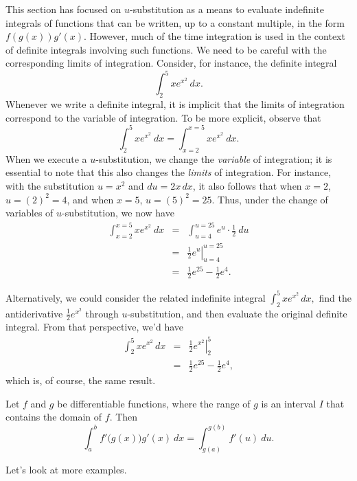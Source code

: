 This section has focused on $u$-substitution as a means to evaluate indefinite integrals of functions that can be written, up to a constant multiple, in the form $f(g(x))g'(x)$.  However, much of the time integration is used in the context of definite integrals involving such functions. We need to be careful with the corresponding limits of integration.  Consider, for instance, the definite integral
\[ \int_2^5 xe^{x^2} \ dx. \]
Whenever we write a definite integral, it is implicit that the limits of integration correspond to the variable of integration.  To be more explicit, observe that
\[ \int_2^5 xe^{x^2} \ dx = \int_{x=2}^{x=5} xe^{x^2} \ dx. \]
When we execute a $u$-substitution, we change the \emph{variable} of integration; it is essential to note that this also changes the \emph{limits} of integration.  For instance, with the substitution $u = x^2$ and $du = 2x \, dx$, it also follows that when $x = 2$, $u = (2)^2 = 4$, and when $x = 5$, $u = (5)^2 = 25.$  Thus, under the change of variables of $u$-substitution, we now have
\begin{eqnarray*}
\int_{x=2}^{x=5} xe^{x^2} \ dx & = & \int_{u=4}^{u=25} e^{u} \cdot \frac{1}{2} \ du \\
& = & \left. \frac{1}{2}e^u \right|_{u=4}^{u=25} \\
& = & \frac{1}{2}e^{25} - \frac{1}{2}e^4.
\end{eqnarray*}

Alternatively, we could consider the related indefinite integral $\int_2^5 xe^{x^2} \, dx,$ find the antiderivative $\frac{1}{2}e^{x^2}$ through $u$-substitution, and then evaluate the original definite integral.  From that perspective, we'd have
\begin{eqnarray*}
\int_{2}^{5} xe^{x^2} \, dx & = & \left. \frac{1}{2}e^{x^2} \right|_{2}^{5} \\
& = & \frac{1}{2}e^{25} - \frac{1}{2}e^4,
\end{eqnarray*}
which is, of course, the same result.

{Let $f$ and $g$ be differentiable functions, where the range of $g$ is an interval $I$ that contains the domain of $f$. Then 
\[ \int_a^b f'\big(g(x)\big)g'(x)\ dx = \int_{g(a)}^{g(b)} f'(u)\ du. \]
} %

Let's look at more examples.


